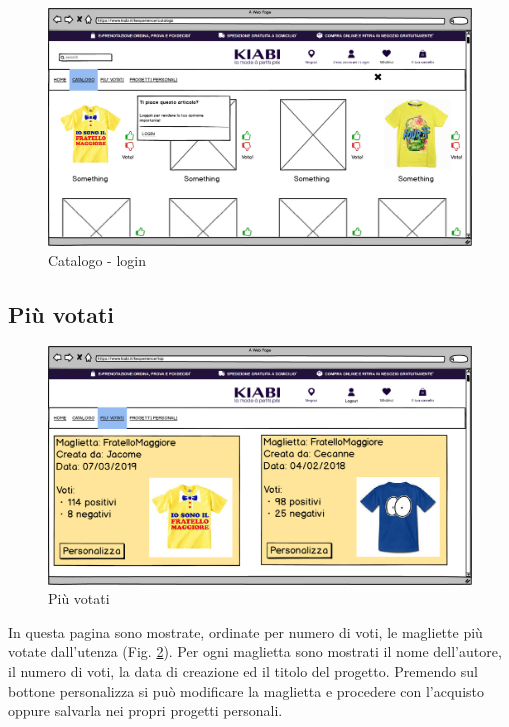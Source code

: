 \documentclass[12pt,italian,]{report}
\begin{document}
\begin{figure}[h]
\centering
\includegraphics{../balsamiq/balsamiq_finale/Catalogologin.png}
\caption{Catalogo - login}
\label{cat-login}
\end{figure}

\newpage
\hypertarget{piuxf9-votati}{%
\subsection{Più votati}\label{piuxf9-votati}}

\begin{figure}[h]
\centering
\includegraphics{../balsamiq/balsamiq_finale/MostRated.png}
\caption{Più votati}
\label{most-rated}
\end{figure}

In questa pagina sono mostrate, ordinate per numero di voti, le
magliette più votate dall'utenza (Fig. \ref{most-rated}). Per ogni maglietta sono mostrati
il nome dell'autore, il numero di voti, la data di creazione ed il titolo del
progetto. Premendo sul bottone personalizza si può modificare la
maglietta e procedere con l'acquisto oppure salvarla nei propri progetti personali.
\end{document}
